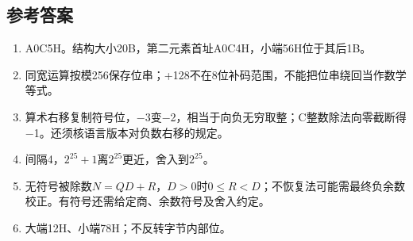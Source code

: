 \subsection{参考答案}\label{CO02-answers}

\begin{enumerate}
\def\labelenumi{\arabic{enumi}.}
\setcounter{enumi}{3}
\tightlist
\item
  A0C5H。结构大小20B，第二元素首址A0C4H，小端56H位于其后1B。
\item
  同宽运算按模256保存位串；+128不在8位补码范围，不能把位串绕回当作数学等式。
\item
  算术右移复制符号位，\ensuremath{-}3变\ensuremath{-}2，相当于向负无穷取整；C整数除法向零截断得\ensuremath{-}1。还须核语言版本对负数右移的规定。
\item
  间隔4，\(2^{25}+1\)离\(2^{25}\)更近，舍入到\(2^{25}\)。
\item
  无符号被除数\(N=QD+R\)，\(D>0\)时\(0\le R<D\)；不恢复法可能需最终负余数校正。有符号还需给定商、余数符号及舍入约定。
\item
  大端12H、小端78H；不反转字节内部位。
\end{enumerate}
